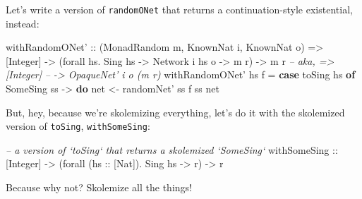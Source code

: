 \documentclass[]{article}
\newenvironment{Shaded}{}{}
\newcommand{\KeywordTok}[1]{\textcolor[rgb]{0.00,0.44,0.13}{\textbf{{#1}}}}
\newcommand{\DataTypeTok}[1]{\textcolor[rgb]{0.56,0.13,0.00}{{#1}}}
\newcommand{\CommentTok}[1]{\textcolor[rgb]{0.38,0.63,0.69}{\textit{{#1}}}}
\newcommand{\OtherTok}[1]{\textcolor[rgb]{0.00,0.44,0.13}{{#1}}}
\newcommand{\FunctionTok}[1]{\textcolor[rgb]{0.02,0.16,0.49}{{#1}}}
\newcommand{\NormalTok}[1]{{#1}}
\begin{document}
Let's write a version of \texttt{randomONet} that returns a continuation-style
existential, instead:

\begin{Shaded}
\begin{Highlighting}[]
\OtherTok{withRandomONet' ::} \NormalTok{(}\DataTypeTok{MonadRandom} \NormalTok{m, }\DataTypeTok{KnownNat} \NormalTok{i, }\DataTypeTok{KnownNat} \NormalTok{o)}
                \OtherTok{=>} \NormalTok{[}\DataTypeTok{Integer}\NormalTok{]}
                \OtherTok{->} \NormalTok{(forall hs}\FunctionTok{.} \DataTypeTok{Sing} \NormalTok{hs }\OtherTok{->} \DataTypeTok{Network} \NormalTok{i hs o }\OtherTok{->} \NormalTok{m r)}
                \OtherTok{->} \NormalTok{m r}
\CommentTok{--         aka, => [Integer]}
\CommentTok{--              -> OpaqueNet' i o (m r)}
\NormalTok{withRandomONet' hs f }\FunctionTok{=} \KeywordTok{case} \NormalTok{toSing hs }\KeywordTok{of}
                         \DataTypeTok{SomeSing} \NormalTok{ss }\OtherTok{->} \KeywordTok{do}
                           \NormalTok{net }\OtherTok{<-} \NormalTok{randomNet' ss}
                           \NormalTok{f ss net}
\end{Highlighting}
\end{Shaded}

But, hey, because we're skolemizing everything, let's do it with the skolemized
version of \texttt{toSing}, \texttt{withSomeSing}:

\begin{Shaded}
\begin{Highlighting}[]
\CommentTok{-- a version of `toSing` that returns a skolemized `SomeSing`}
\OtherTok{withSomeSing ::} \NormalTok{[}\DataTypeTok{Integer}\NormalTok{]}
             \OtherTok{->} \NormalTok{(forall (}\OtherTok{hs ::} \NormalTok{[}\DataTypeTok{Nat}\NormalTok{])}\FunctionTok{.} \DataTypeTok{Sing} \NormalTok{hs }\OtherTok{->} \NormalTok{r)}
             \OtherTok{->} \NormalTok{r}
\end{Highlighting}
\end{Shaded}

Because why not? Skolemize all the things!
\end{document}
